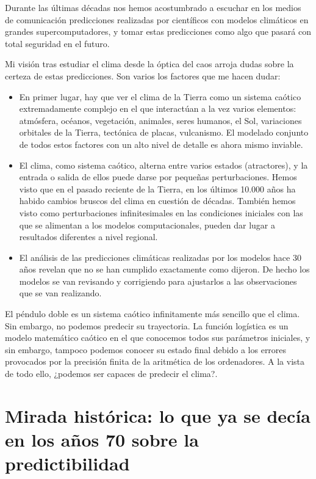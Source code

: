 \documentclass[
  10pt,
  a4paper,
  DIV=11,
  numbers=noendperiod,
  open=any]{scrreprt}
\providecommand{\tightlist}{%
  \setlength{\itemsep}{0pt}\setlength{\parskip}{0pt}}
\numberwithin{equation}{chapter}
\numberwithin{equation}{section}
\renewcommand{\[}{\begin{equation}}
\renewcommand{\]}{\end{equation}}
\begin{document}
Durante las últimas décadas nos hemos acostumbrado a escuchar en los
medios de comunicación predicciones realizadas por científicos con
modelos climáticos en grandes supercomputadores, y tomar estas
predicciones como algo que pasará con total seguridad en el futuro.

Mi visión tras estudiar el clima desde la óptica del caos arroja dudas
sobre la certeza de estas predicciones. Son varios los factores que me
hacen dudar:

\begin{itemize}
\tightlist
\item
  En primer lugar, hay que ver el clima de la Tierra como un sistema
  caótico extremadamente complejo en el que interactúan a la vez varios
  elementos: atmósfera, océanos, vegetación, animales, seres humanos, el
  Sol, variaciones orbitales de la Tierra, tectónica de placas,
  vulcanismo. El modelado conjunto de todos estos factores con un alto
  nivel de detalle es ahora mismo inviable.
\item
  El clima, como sistema caótico, alterna entre varios estados
  (atractores), y la entrada o salida de ellos puede darse por pequeñas
  perturbaciones. Hemos visto que en el pasado reciente de la Tierra,
  en los últimos 10.000 años ha habido cambios bruscos del clima en
  cuestión de décadas. También hemos visto como perturbaciones
  infinitesimales en las condiciones iniciales con las que se alimentan
  a los modelos computacionales, pueden dar lugar a resultados
  diferentes a nivel regional.
\item
  El análisis de las predicciones climáticas realizadas por los modelos
  hace 30 años revelan que no se han cumplido exactamente como dijeron. De hecho los modelos se van revisando y corrigiendo para ajustarlos a las observaciones que se van realizando.
\end{itemize}

El péndulo doble es un sistema caótico infinitamente más sencillo que el
clima. Sin embargo, no podemos predecir su trayectoria. La función
logística es un modelo matemático caótico en el que conocemos todos sus
parámetros iniciales, y sin embargo, tampoco podemos conocer su estado
final debido a los errores provocados por la precisión finita de la
aritmética de los ordenadores. A la vista de todo ello, ¿podemos ser
capaces de predecir el clima?.

\section{Mirada histórica: lo que ya se decía en los años 70 sobre la
predictibilidad}\label{mirada-histuxf3rica-lo-que-ya-se-decuxeda-en-los-auxf1os-70-sobre-la-predictibilidad}
\end{document}
